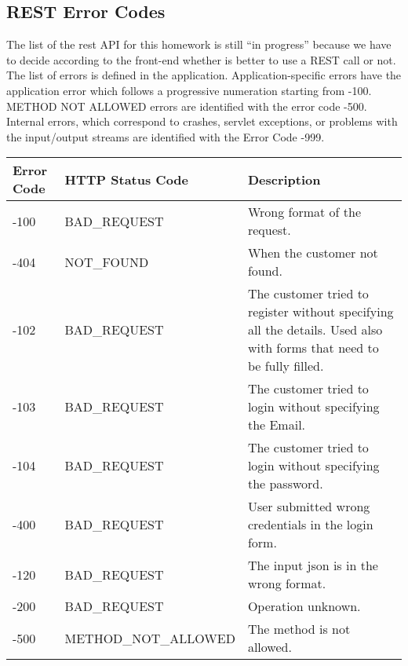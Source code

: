 \subsection{REST Error Codes}
The list of the rest API for this homework is still “in progress” because we have to decide according to the
front-end whether is better to use a REST call or not. The list of errors is defined in the application. Application-specific errors have the application error which follows a progressive numeration starting from -100. METHOD
NOT ALLOWED errors are identified with the error code -500. Internal errors, which correspond to crashes, servlet
exceptions, or problems with the input/output streams are identified with the Error Code -999.

 \begin{longtable}{|p{}|p{} |p{}|} 
 \hline
 \textbf{Error Code} & \textbf{HTTP Status Code} & \textbf{Description} \\\hline
 -100 & BAD\_REQUEST            & Wrong format of the request. \\ \hline
 -404 & NOT\_FOUND              & When the customer not found. \\ \hline
 -102 & BAD\_REQUEST            & The customer tried to register without specifying all the details. Used also with forms that need to be fully filled. \\ \hline
 -103 & BAD\_REQUEST            & The customer tried to login without specifying the Email. \\ \hline
 -104 & BAD\_REQUEST            & The customer tried to login without specifying the password. \\ \hline
 -400 & BAD\_REQUEST            & User submitted wrong credentials in the login form. \\ \hline
 -120 & BAD\_REQUEST            & The input json is in the wrong format. \\ \hline
 -200 & BAD\_REQUEST            & Operation unknown. \\ \hline
 -500 & METHOD\_NOT\_ALLOWED    & The method is not allowed. \\ \hline

 \end{longtable}